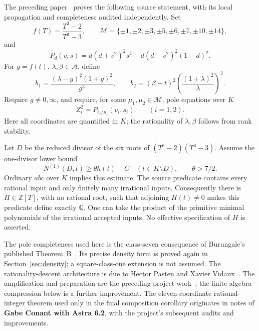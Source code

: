 \documentclass[11pt,a4paper]{article}
\newcommand{\Q}{\mathbb Q}\newcommand{\Z}{\mathbb Z}
\begin{document}
The preceding paper~\cite{amplified} proves the following source
statement, with its local propagation and completeness audited
independently. Set
\begin{equation}\label{eq:f}
 f(T)=\frac{T^3-2}{T^3-3},\qquad
 \mathcal M=\{\pm1,\pm2,\pm3,\pm5,\pm6,\pm7,\pm10,\pm14\},
\end{equation}
and
\begin{equation}\label{eq:pole}
 P_d(v,s)=d(d+v^2)^2s^4-d(d-v^2)^2(1-d)^2.
\end{equation}
For \(g=f(t)\), \(\lambda,\beta\in\mathcal A\), define
\begin{equation}\label{eq:sourceinputs}
 b_1=\frac{(\lambda-g)^2(1+g)^2}{g^3},\qquad
 b_2=(\beta-t)^2\left(\frac{(1+\lambda)^2}{\lambda}\right)^3.
\end{equation}
Require \(g\ne0,\infty\), and require, for some
\(\mu_1,\mu_2\in\mathcal M\), pole equations over \(K\)
\[
                    Z_i^2=P_{b_i/\mu_i}(v_i,s_i)\qquad(i=1,2).
\]
Here all coordinates are quantified in \(K\); the rationality of
\(\lambda,\beta\) follows from rank stability.

Let \(D\) be the reduced divisor of the six roots of
\((T^3-2)(T^3-3)\). Assume the one-divisor lower bound
\begin{equation}\label{eq:height}
 N^{(1)}(D,t)\ge\theta h(t)-C\quad(t\in K\setminus D),
 \qquad \theta>7/2.
\end{equation}
Ordinary \(abc\) over \(K\) implies this estimate. The source predicate
contains every rational input and only finitely many irrational inputs.
Consequently there is \(H\in\Z[T]\), with no rational root, such that
adjoining \(H(t)\ne0\) makes this predicate define exactly \(\Q\).
One can take the product of the primitive minimal polynomials of the
irrational accepted inputs. No effective specification of \(H\) is asserted.

The pole completeness used here is the class-seven consequence of
Burungale's published Theorem~B~\cite{Burungale}. Its precise density
form is proved again in Section~\ref{sec:density}; a square-class-one
extension is not assumed. The rationality-descent architecture is due
to Hector Pasten and Xavier Vidaux~\cite{PV}. The amplification and
preparation are the preceding project work~\cite{amplified}; the
finite-algebra compression below is a further improvement. The
eleven-coordinate rational-integer theorem used only in the final
composition corollary originates in notes of \textbf{Gabe Conant with
Astra 6.2}, with the project's subsequent audits and improvements.
\end{document}
